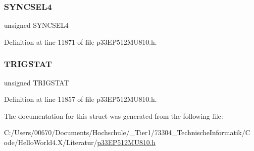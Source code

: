 \mbox{\label{structtag_o_c11_c_o_n2_b_i_t_s_a0cd5bbe196c7974953909d27a6307bb7}} 
\subsubsection{\texorpdfstring{S\+Y\+N\+C\+S\+E\+L4}{SYNCSEL4}}
{\footnotesize\ttfamily unsigned S\+Y\+N\+C\+S\+E\+L4}



Definition at line 11871 of file p33\+E\+P512\+M\+U810.\+h.

\mbox{\label{structtag_o_c11_c_o_n2_b_i_t_s_ab379549de54ac93ad4aa73686c34cb7c}} 
\subsubsection{\texorpdfstring{T\+R\+I\+G\+S\+T\+AT}{TRIGSTAT}}
{\footnotesize\ttfamily unsigned T\+R\+I\+G\+S\+T\+AT}



Definition at line 11857 of file p33\+E\+P512\+M\+U810.\+h.



The documentation for this struct was generated from the following file\+:\begin{DoxyCompactItemize}
\item 
C\+:/\+Users/00670/\+Documents/\+Hochschule/\+\_\+\+Tier1/73304\+\_\+\+Technische\+Informatik/\+Code/\+Hello\+World4.\+X/\+Literatur/\hyperlink{p33_e_p512_m_u810_8h}{p33\+E\+P512\+M\+U810.\+h}\end{DoxyCompactItemize}
